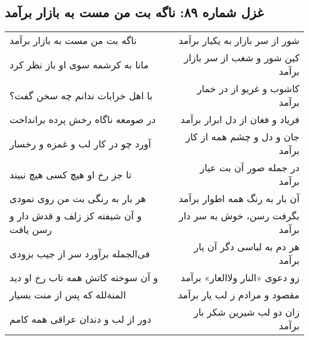\begin{center}
\section*{غزل شماره ۸۹: ناگه بت من مست به بازار برآمد}
\label{sec:089}
\begin{longtable}{l p{0.5cm} r}
ناگه بت من مست به بازار برآمد
&&
شور از سر بازار به یکبار برآمد
\\
مانا به کرشمه سوی او باز نظر کرد
&&
کین شور و شغب از سر بازار برآمد
\\
با اهل خرابات ندانم چه سخن گفت؟
&&
کاشوب و غریو از در خمار برآمد
\\
در صومعه ناگاه رخش پرده برانداخت
&&
فریاد و فغان از دل ابرار برآمد
\\
آورد چو در کار لب و غمزه و رخسار
&&
جان و دل و چشم همه از کار برآمد
\\
تا جز رخ او هیچ کسی هیچ نبیند
&&
در جمله صور آن بت عیار برآمد
\\
هر بار به رنگی بت من روی نمودی
&&
آن بار به رنگ همه اطوار برآمد
\\
و آن شیفته کز زلف و قدش دار و رسن یافت
&&
بگرفت رسن، خوش به سر دار برآمد
\\
فی‌الجمله برآورد سر از جیب بزودی
&&
هر دم به لباسی دگر آن یار برآمد
\\
و آن سوخته کاتش همه تاب رخ او دید
&&
زو دعوی «النار ولاالعار» برآمد
\\
المنةلله که پس از منت بسیار
&&
مقصود و مرادم ز لب یار برآمد
\\
دور از لب و دندان عراقی همه کامم
&&
زان دو لب شیرین شکر بار برآمد
\\
\end{longtable}
\end{center}
